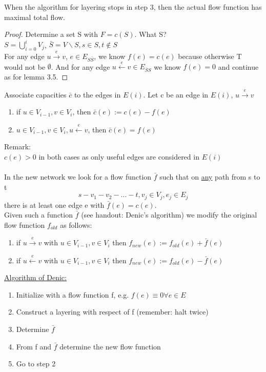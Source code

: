 \begin{theorem}
When the algorithm for layering stops in step 3, then the actual flow function has maximal total flow.
\end{theorem}

\begin{proof}
Determine a set S with $F = c(S)$. What S? \\
$ S = \bigcup_{i=0}^i V_j$, $\bar{S} = V \backslash S, s \in S, t \notin S$ \\ 
For any edge $ u \xrightarrow{e} v$, $e \in E_{S\bar{S}}$, we know $f(e) = c(e)$ because otherwise T would not be $\emptyset$. And for any edge $u \xleftarrow{e} v \in E_{\bar{S}S}$ we know $f(e) = 0$ and continue as for lemma 3.5.
\end{proof}

\begin{definition}
Associate capacities $\bar{c}$ to the edges in $E(i)$. Let c be an edge in $E(i)$, $ u \xrightarrow{e} v$ 
\begin{enumerate}
\item if $ u \in V_{i-1}, v \in V_i$, then $\bar{c}(e) := c(e) - f(e)$
\item $u \in V_{i-1}, v \in V_i, u \xleftarrow{e} v$, then $\bar{c}(e) = f(e)$
\end{enumerate}
Remark: \\
$c(e) > 0 $ in both cases as only useful edges are considered in $E(i)$ \\ \\

In the new network we look for a flow function $\bar{f}$ such that on \underline{any} path from s to t 
\[s - v_1 - v_2 - ... - t, v_j \in V_j, e_j \in E_j\]
there is at least one edge e with $\bar{f}(e) = c(e)$. \\
Given such a function $\bar{f}$ (see handout: Denic's algorithm) we modify the original flow function $f_{old}$ as follows:
\begin{enumerate}
\item if $u \xrightarrow{e} v$ with $u \in V_{i-1}, v \in V_i$ then $f_{new}(e) := f_{old}(e) + \bar{f}(e)$
\item if $u \xleftarrow{e} v$ with $u \in V_{i-1}, v \in V_i$ then $f_{new}(e) := f_{old}(e) - \bar{f}(e) $
\end{enumerate}
\underline{Algorithm of Denic:} \\
\begin{enumerate}
\item Initialize with a flow function f, e.g. $f(e) \equiv 0 \forall e \in E$
\item Construct a layering with respect of f (remember: halt twice)
\item Determine $\bar{f}$
\item From f and $\bar{f}$ determine the new flow function
\item Go to step 2
\end{enumerate}
\end{definition}

\begin{example}

\end{example}